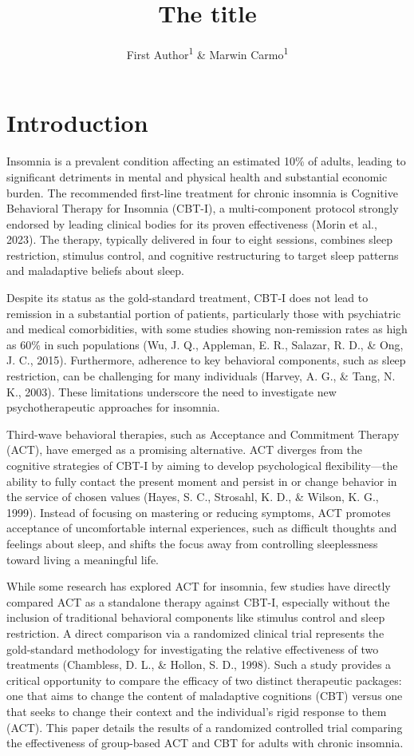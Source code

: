\documentclass[
  man]{apa6}
\title{The title}
\author{First Author\textsuperscript{1} \& Marwin Carmo\textsuperscript{1}}
\date{}
\affiliation{\vspace{0.5cm}\textsuperscript{1} University of California, Davis}
\begin{document}
\maketitle

\section{Introduction}\label{introduction}

Insomnia is a prevalent condition affecting an estimated 10\% of adults, leading to significant detriments in mental and physical health and substantial economic burden. The recommended first-line treatment for chronic insomnia is Cognitive Behavioral Therapy for Insomnia (CBT-I), a multi-component protocol strongly endorsed by leading clinical bodies for its proven effectiveness (Morin et al., 2023). The therapy, typically delivered in four to eight sessions, combines sleep restriction, stimulus control, and cognitive restructuring to target sleep patterns and maladaptive beliefs about sleep.

Despite its status as the gold-standard treatment, CBT-I does not lead to remission in a substantial portion of patients, particularly those with psychiatric and medical comorbidities, with some studies showing non-remission rates as high as 60\% in such populations (Wu, J. Q., Appleman, E. R., Salazar, R. D., \& Ong, J. C., 2015). Furthermore, adherence to key behavioral components, such as sleep restriction, can be challenging for many individuals (Harvey, A. G., \& Tang, N. K., 2003). These limitations underscore the need to investigate new psychotherapeutic approaches for insomnia.

Third-wave behavioral therapies, such as Acceptance and Commitment Therapy (ACT), have emerged as a promising alternative. ACT diverges from the cognitive strategies of CBT-I by aiming to develop psychological flexibility---the ability to fully contact the present moment and persist in or change behavior in the service of chosen values (Hayes, S. C., Strosahl, K. D., \& Wilson, K. G., 1999). Instead of focusing on mastering or reducing symptoms, ACT promotes acceptance of uncomfortable internal experiences, such as difficult thoughts and feelings about sleep, and shifts the focus away from controlling sleeplessness toward living a meaningful life.

While some research has explored ACT for insomnia, few studies have directly compared ACT as a standalone therapy against CBT-I, especially without the inclusion of traditional behavioral components like stimulus control and sleep restriction. A direct comparison via a randomized clinical trial represents the gold-standard methodology for investigating the relative effectiveness of two treatments (Chambless, D. L., \& Hollon, S. D., 1998). Such a study provides a critical opportunity to compare the efficacy of two distinct therapeutic packages: one that aims to change the content of maladaptive cognitions (CBT) versus one that seeks to change their context and the individual's rigid response to them (ACT). This paper details the results of a randomized controlled trial comparing the effectiveness of group-based ACT and CBT for adults with chronic insomnia.
\end{document}

